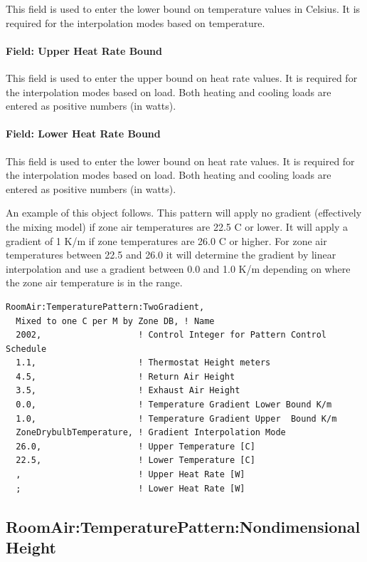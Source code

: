 This field is used to enter the lower bound on temperature values in Celsius. It is required for the interpolation modes based on temperature.

\paragraph{Field: Upper Heat Rate Bound}\label{field-upper-heat-rate-bound}

This field is used to enter the upper bound on heat rate values. It is required for the interpolation modes based on load. Both heating and cooling loads are entered as positive numbers (in watts).

\paragraph{Field: Lower Heat Rate Bound}\label{field-lower-heat-rate-bound}

This field is used to enter the lower bound on heat rate values. It is required for the interpolation modes based on load. Both heating and cooling loads are entered as positive numbers (in watts).

An example of this object follows. This pattern will apply no gradient (effectively the mixing model) if zone air temperatures are 22.5 C or lower. It will apply a gradient of 1 K/m if zone temperatures are 26.0 C or higher. For zone air temperatures between 22.5 and 26.0 it will determine the gradient by linear interpolation and use a gradient between 0.0 and 1.0 K/m depending on where the zone air temperature is in the range.

\begin{lstlisting}
RoomAir:TemperaturePattern:TwoGradient,
  Mixed to one C per M by Zone DB, ! Name
  2002,                   ! Control Integer for Pattern Control Schedule
  1.1,                    ! Thermostat Height meters
  4.5,                    ! Return Air Height
  3.5,                    ! Exhaust Air Height
  0.0,                    ! Temperature Gradient Lower Bound K/m
  1.0,                    ! Temperature Gradient Upper  Bound K/m
  ZoneDrybulbTemperature, ! Gradient Interpolation Mode
  26.0,                   ! Upper Temperature [C]
  22.5,                   ! Lower Temperature [C]
  ,                       ! Upper Heat Rate [W]
  ;                       ! Lower Heat Rate [W]
\end{lstlisting}

\subsection{RoomAir:TemperaturePattern:NondimensionalHeight}\label{roomairtemperaturepatternnondimensionalheight}

